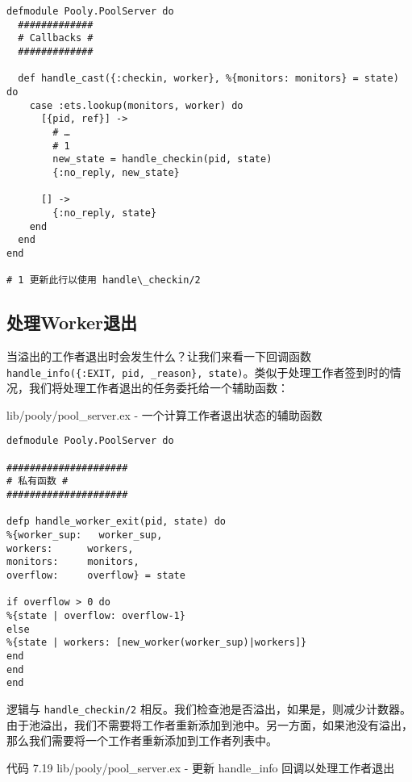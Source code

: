 \begin{code}{}
\begin{verbatim}
defmodule Pooly.PoolServer do
  #############
  # Callbacks #
  #############

  def handle_cast({:checkin, worker}, %{monitors: monitors} = state) do
    case :ets.lookup(monitors, worker) do
      [{pid, ref}] ->
        # …
        # 1
        new_state = handle_checkin(pid, state)
        {:no_reply, new_state}

      [] ->
        {:no_reply, state}
    end
  end
end

# 1 更新此行以使用 handle\_checkin/2
\end{verbatim}
\end{code}


\subsection{处理Worker退出}

当溢出的工作者退出时会发生什么？让我们来看一下回调函数
\texttt{handle\_info(\{:EXIT, pid, \_reason\}, state)}。类似于处理工作者签到时的情况，我们将处理工作者退出的任务委托给一个辅助函数：

\begin{code}{lib/pooly/pool\_server.ex - 一个计算工作者退出状态的辅助函数}

\begin{verbatim}
defmodule Pooly.PoolServer do

#####################
# 私有函数 #
#####################

defp handle_worker_exit(pid, state) do
%{worker_sup:   worker_sup,
workers:      workers,
monitors:     monitors,
overflow:     overflow} = state

if overflow > 0 do
%{state | overflow: overflow-1}
else
%{state | workers: [new_worker(worker_sup)|workers]}
end
end
end
\end{verbatim}
\end{code}

逻辑与 \texttt{handle\_checkin/2}
相反。我们检查池是否溢出，如果是，则减少计数器。由于池溢出，我们不需要将工作者重新添加到池中。另一方面，如果池没有溢出，那么我们需要将一个工作者重新添加到工作者列表中。

代码 7.19 lib/pooly/pool\_server.ex - 更新 handle\_info
回调以处理工作者退出

